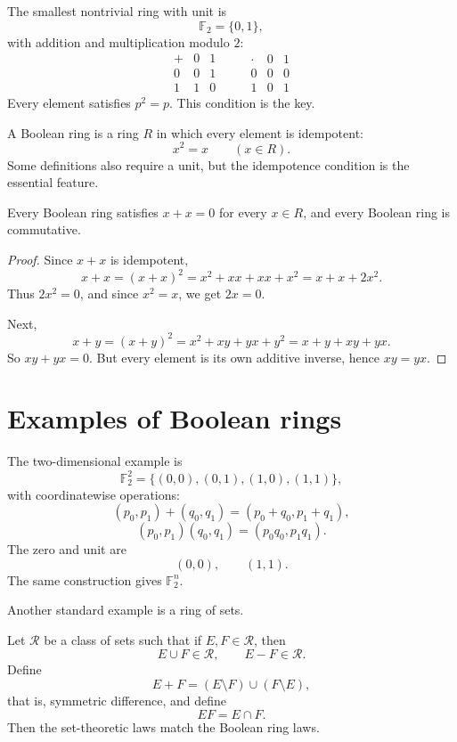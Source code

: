 The smallest nontrivial ring with unit is
\[
  \mathbb F_2=\{0,1\},
\]
with addition and multiplication modulo \(2\):
\[
\begin{array}{c|cc}
+&0&1\\\hline
0&0&1\\
1&1&0
\end{array}
\qquad
\begin{array}{c|cc}
\cdot&0&1\\\hline
0&0&0\\
1&0&1
\end{array}
\]
Every element satisfies \(p^2=p\).  This condition is the key.

\begin{definition}
A Boolean ring is a ring \(R\) in which every element is idempotent:
\[
  x^2=x
  \qquad(x\in R).
\]
Some definitions also require a unit, but the idempotence condition is the essential feature.
\end{definition}

\begin{proposition}
Every Boolean ring satisfies \(x+x=0\) for every \(x\in R\), and every Boolean ring is commutative.
\end{proposition}

\begin{proof}
Since \(x+x\) is idempotent,
\[
  x+x=(x+x)^2=x^2+xx+xx+x^2=x+x+2x^2.
\]
Thus \(2x^2=0\), and since \(x^2=x\), we get \(2x=0\).

Next,
\[
  x+y=(x+y)^2=x^2+xy+yx+y^2=x+y+xy+yx.
\]
So \(xy+yx=0\).  But every element is its own additive inverse, hence \(xy=yx\).
\end{proof}

\section{Examples of Boolean rings}

The two-dimensional example is
\[
  \mathbb F_2^2=\{(0,0),(0,1),(1,0),(1,1)\},
\]
with coordinatewise operations:
\[
  (p_0,p_1)+(q_0,q_1)=(p_0+q_0,p_1+q_1),
\]
\[
  (p_0,p_1)(q_0,q_1)=(p_0q_0,p_1q_1).
\]
The zero and unit are
\[
  (0,0),\qquad (1,1).
\]
The same construction gives \(\mathbb F_2^n\).

Another standard example is a ring of sets.

\begin{example}
Let \(\mathcal R\) be a class of sets such that if \(E,F\in\mathcal R\), then
\[
  E\cup F\in\mathcal R,\qquad E-F\in\mathcal R.
\]
Define
\[
  E+F=(E\setminus F)\cup(F\setminus E),
\]
that is, symmetric difference, and define
\[
  EF=E\cap F.
\]
Then the set-theoretic laws match the Boolean ring laws.
\end{example}

